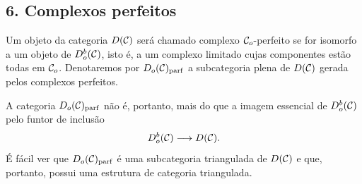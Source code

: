 \subsection*{6. Complexos perfeitos}

Um objeto da categoria $D(\mathcal C)$ será chamado complexo $\mathcal C_o$-perfeito se for isomorfo a um objeto de $D_o^b(\mathcal C)$, isto é, a um complexo limitado cujas componentes estão todas em $\mathcal C_o$. Denotaremos por $D_o(\mathcal C)_{\mathrm{parf}}$ a subcategoria plena de $D(\mathcal C)$ gerada pelos complexos perfeitos.

A categoria $D_o(\mathcal C)_{\mathrm{parf}}$ não é, portanto, mais do que a imagem essencial de $D_o^b(\mathcal C)$ pelo funtor de inclusão
\[
D_o^b(\mathcal C)\longrightarrow D(\mathcal C).
\]
É fácil ver que $D_o(\mathcal C)_{\mathrm{parf}}$ é uma subcategoria triangulada de $D(\mathcal C)$ e que, portanto, possui uma estrutura de categoria triangulada.
